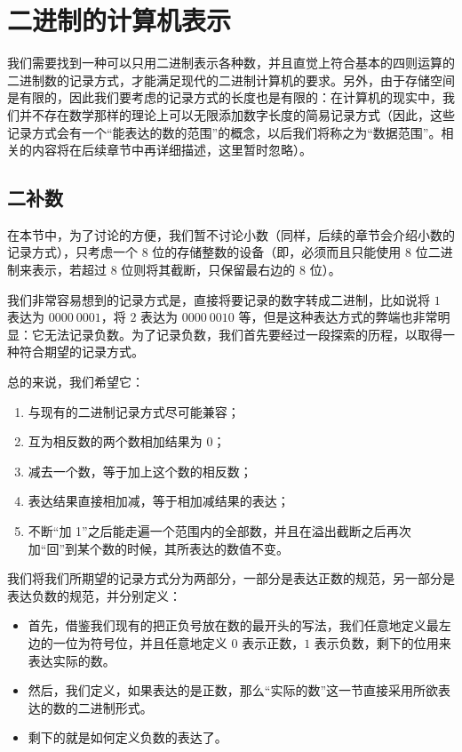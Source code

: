 \section{二进制的计算机表示}\label{sec:NumberSystemBasics/BinaryPresentationOnComputer}
    我们需要找到一种可以只用二进制表示各种数，并且直觉上符合基本的四则运算的二进制数的记录方式，才能满足现代的二进制计算机的要求。另外，由于存储空间是有限的，因此我们要考虑的记录方式的长度也是有限的：在计算机的现实中，我们并不存在数学那样的理论上可以无限添加数字长度的简易记录方式（因此，这些记录方式会有一个“能表达的数的范围”的概念，以后我们将称之为“数据范围”。相关的内容将在后续章节中再详细描述，这里暂时忽略）。

    \subsection{二补数}\label{subsec:NumberSystemBasics/BinaryPresentation/TwosComplement}
        在本节中，为了讨论的方便，我们暂不讨论小数（同样，后续的章节会介绍小数的记录方式），只考虑一个 $8$ 位的存储整数的设备（即，必须而且只能使用 $8$ 位二进制来表示，若超过 $8$ 位则将其截断，只保留最右边的 $8$ 位）。

        我们非常容易想到的记录方式是，直接将要记录的数字转成二进制，比如说将 $1$ 表达为 $0000\ 0001$，将 $2$ 表达为 $0000\ 0010$ 等，但是这种表达方式的弊端也非常明显：它无法记录负数。为了记录负数，我们首先要经过一段探索的历程，以取得一种符合期望的记录方式。

        总的来说，我们希望它：
        \begin{enumerate}
            \item 与现有的二进制记录方式尽可能兼容；
            \item 互为相反数的两个数相加结果为 $0$；
            \item 减去一个数，等于加上这个数的相反数；
            \item 表达结果直接相加减，等于相加减结果的表达；
            \item 不断“加 1”之后能走遍一个范围内的全部数，并且在溢出截断之后再次加“回”到某个数的时候，其所表达的数值不变。
        \end{enumerate}

        我们将我们所期望的记录方式分为两部分，一部分是表达正数的规范，另一部分是表达负数的规范，并分别定义：
        \begin{itemize}
            \item 首先，借鉴我们现有的把正负号放在数的最开头的写法，我们任意地定义最左边的一位为符号位，并且任意地定义 $0$ 表示正数，$1$ 表示负数，剩下的位用来表达实际的数。
            \item 然后，我们定义，如果表达的是正数，那么“实际的数”这一节直接采用所欲表达的数的二进制形式。
            \item 剩下的就是如何定义负数的表达了。
        \end{itemize}

